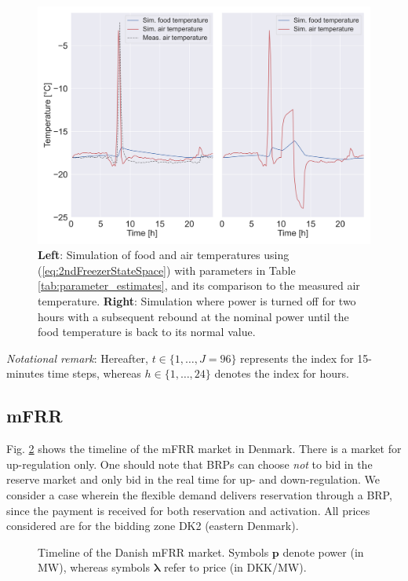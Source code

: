 \documentclass[11pt,a4paper]{article}
\begin{document}
\begin{figure}[!t]
    \centering
    \includegraphics[width=\columnwidth]{figures/2ndFreezerModelSimulation.png}
    \caption{ \textbf{Left}: Simulation of food and air temperatures using (\ref{eq:2ndFreezerStateSpace}) with parameters in Table \ref{tab:parameter_estimates}, and its comparison to the measured air temperature. \textbf{Right}: Simulation where power is turned off for two hours with a subsequent rebound at the nominal power until the food temperature is back to its normal value.}
    \label{fig:2ndFreezerModelSimulation}
\end{figure}

\textit{Notational remark}: Hereafter, $t \in \{1, \ldots, J=96\}$ represents the index for 15-minutes time steps, whereas $h\in \{1, \ldots, 24 \}$ denotes the index for hours.

\subsection{mFRR}\label{sec:mFRR}
%
Fig. \ref{fig:timeline_mfrr} shows the timeline of the mFRR market in Denmark. There is a market for up-regulation only. One should note  that BRPs can choose \textit{not} to bid in the reserve market and  only bid in the real time for up- and down-regulation. We consider a case wherein the flexible demand delivers reservation through a BRP, since the payment is received for both reservation and activation. All prices considered are for the bidding zone DK2 (eastern Denmark).


\begin{figure}[!t]
    \centering
    
    \caption{Timeline of the Danish mFRR market. Symbols $\bm{p}$ denote power (in MW), whereas symbols  $\bm{\lambda}$ refer to price (in DKK/MW).}
    \label{fig:timeline_mfrr}
\end{figure}
\end{document}
